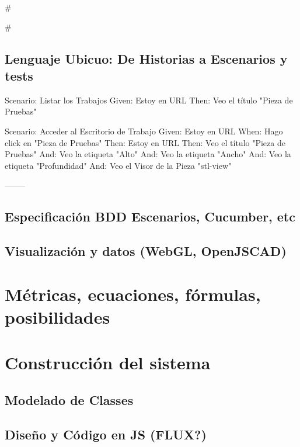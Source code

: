 #



#\subsection{Lenguaje Ubicuo: De Historias a Escenarios y tests}

Scenario: Listar los Trabajos\vskip0mm
  Given: Estoy en URL\vskip0mm
  Then: Veo el título "Pieza de Pruebas"\vskip10mm
 
Scenario: Acceder al Escritorio de Trabajo\vskip0mm
  Given: Estoy en URL\vskip0mm
  When: Hago click en "Pieza de Pruebas"\vskip0mm
  Then: Estoy en URL\vskip0mm
  Then: Veo el título "Pieza de Pruebas"\vskip0mm
  And: Veo la etiqueta "Alto"\vskip0mm
  And: Veo la etiqueta "Ancho"\vskip0mm
  And: Veo la etiqueta "Profundidad"\vskip0mm
  And: Veo el Visor de la Pieza "stl-view"
  
  
  
  
  
  
  --------
  
  \subsection{Especificación BDD Escenarios, Cucumber, etc}

\subsection{Visualización y datos (WebGL, OpenJSCAD)}


\section{Métricas, ecuaciones, fórmulas, posibilidades}


\section{Construcción del sistema}

\subsection{Modelado de Classes}

\subsection{Diseño y Código en JS (FLUX?)}

